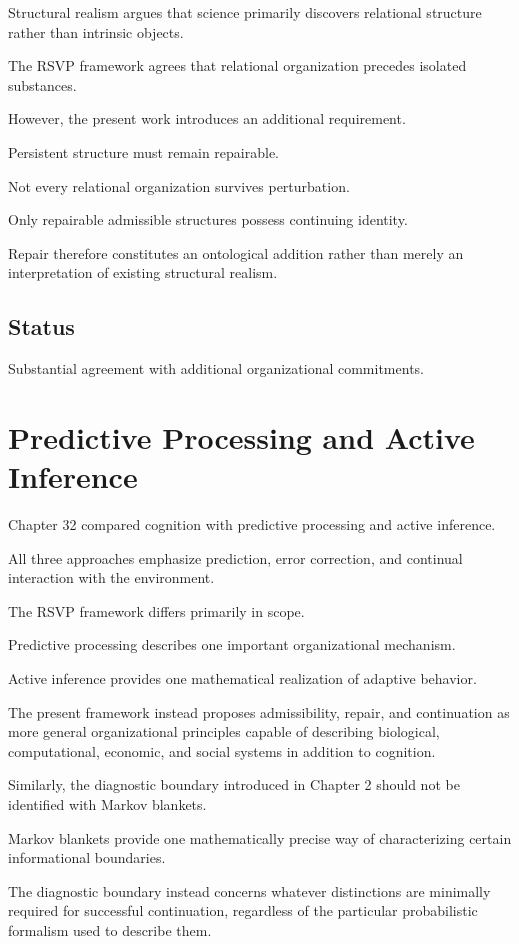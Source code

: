 \documentclass[11pt,oneside]{book}
\numberwithin{equation}{chapter}
\theoremstyle{definition}
\theoremstyle{plain}
\begin{document}
Structural realism argues that science primarily discovers relational
structure rather than intrinsic objects.

The RSVP framework agrees that relational organization precedes isolated
substances.

However, the present work introduces an additional requirement.

Persistent structure must remain repairable.

Not every relational organization survives perturbation.

Only repairable admissible structures possess continuing identity.

Repair therefore constitutes an ontological addition rather than merely an
interpretation of existing structural realism.

\subsection*{Status}

Substantial agreement with additional organizational commitments.

\section{Predictive Processing and Active Inference}

Chapter 32 compared cognition with predictive processing and active
inference.

All three approaches emphasize prediction, error correction, and continual
interaction with the environment.

The RSVP framework differs primarily in scope.

Predictive processing describes one important organizational mechanism.

Active inference provides one mathematical realization of adaptive
behavior.

The present framework instead proposes admissibility, repair, and
continuation as more general organizational principles capable of
describing biological, computational, economic, and social systems in
addition to cognition.

Similarly, the diagnostic boundary introduced in Chapter 2 should not be
identified with Markov blankets.

Markov blankets provide one mathematically precise way of characterizing
certain informational boundaries.

The diagnostic boundary instead concerns whatever distinctions are
minimally required for successful continuation, regardless of the
particular probabilistic formalism used to describe them.
\end{document}

